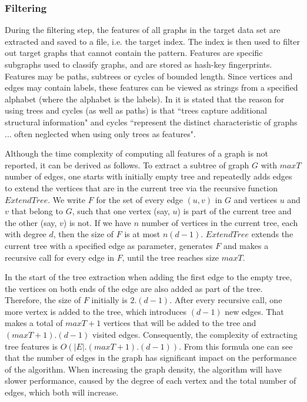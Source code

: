 \documentclass{l4proj}
\theoremstyle{definition}
\begin{document}
\subsubsection{Filtering}
During the filtering step, the features of all graphs in the target data set are extracted and saved to a file, i.e. the target index. The index is then used to filter out target graphs that cannot contain the pattern.  Features are specific subgraphs used to classify graphs, and are stored as hash-key fingerprints. Features may be paths, subtrees or cycles of bounded length. Since vertices and edges may contain labels, these features can be viewed as strings from a specified alphabet (where the alphabet is the labels). In \cite{ctindex} it is stated that the reason for using trees and cycles (as well as paths) is that ``trees capture additional structural information" and cycles ``represent the distinct characteristic of graphs ... often neglected when using only trees as features".

%
%
Although the time complexity of computing all features of a graph is not reported, it can be derived as follows. To extract a subtree of graph $G$ with $maxT$ number of edges, one starts with initially empty tree and repeatedly adds edges to extend the vertices that are in the current tree via the recursive function $ExtendTree$. We write $F$ for the set of every edge $(u,v)$ in $G$ and vertices $u$ and $v$ that belong to $G$, such that one vertex (say, $u$) is part of the current tree and the other (say, $v$) is not. If we have $n$ number of vertices in the current tree, each with degree $d$, then the size of $F$ is at most $n(d-1)$. $ExtendTree$ extends the current tree with a specified edge as parameter, generates $F$ and makes a recursive call for every edge in $F$, until the tree reaches size $maxT$.

In the start of the tree extraction when adding the first edge to the empty tree, the vertices on both ends of the edge are also added as part of the tree. Therefore, the size of $F$ initially is $2.(d-1)$. After every recursive call, one more vertex is added to the tree, which introduces $(d-1)$ new edges. That makes a total of $maxT+1$ vertices that will be added to the tree and $(maxT+1).(d-1)$ visited edges. Consequently, the complexity of extracting tree features is $O(|E|.(maxT+1).(d-1))$. From this formula one can see that the number of edges in the graph has significant impact on the performance of the algorithm. When increasing the graph density, the algorithm will have slower performance, caused by the degree of each vertex and the total number of edges, which both will increase.
\end{document}
